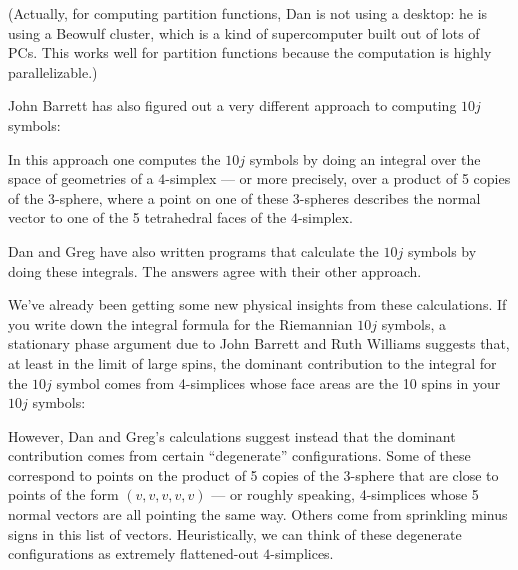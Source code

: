 \documentclass{article}
\def\tightlist{}
\renewcommand{\texttt}[1]{%
  \begingroup
  \ttfamily
  \begingroup\lccode`~=`/\lowercase{\endgroup\def~}{/\discretionary{}{}{}}%
  \begingroup\lccode`~=`[\lowercase{\endgroup\def~}{[\discretionary{}{}{}}%
  \begingroup\lccode`~=`.\lowercase{\endgroup\def~}{.\discretionary{}{}{}}%
  \catcode`/=\active\catcode`[=\active\catcode`.=\active
  \scantokens{#1\noexpand}%
  \endgroup
}
\begin{document}
(Actually, for computing partition functions, Dan is not using a
desktop: he is using a Beowulf cluster, which is a kind of supercomputer
built out of lots of PCs. This works well for partition functions
because the computation is highly parallelizable.)

John Barrett has also figured out a very different approach to computing
\(10j\) symbols:


In this approach one computes the \(10j\) symbols by doing an integral
over the space of geometries of a \(4\)-simplex --- or more precisely,
over a product of 5 copies of the 3-sphere, where a point on one of
these 3-spheres describes the normal vector to one of the 5 tetrahedral
faces of the \(4\)-simplex.

Dan and Greg have also written programs that calculate the \(10j\)
symbols by doing these integrals. The answers agree with their other
approach.

We've already been getting some new physical insights from these
calculations. If you write down the integral formula for the Riemannian
\(10j\) symbols, a stationary phase argument due to John Barrett and
Ruth Williams suggests that, at least in the limit of large spins, the
dominant contribution to the integral for the \(10j\) symbol comes from
4-simplices whose face areas are the 10 spins in your \(10j\) symbols:


However, Dan and Greg's calculations suggest instead that the dominant
contribution comes from certain ``degenerate'' configurations. Some of
these correspond to points on the product of 5 copies of the 3-sphere
that are close to points of the form \((v,v,v,v,v)\) --- or roughly
speaking, 4-simplices whose 5 normal vectors are all pointing the same
way. Others come from sprinkling minus signs in this list of vectors.
Heuristically, we can think of these degenerate configurations as
extremely flattened-out \(4\)-simplices.
\end{document}
